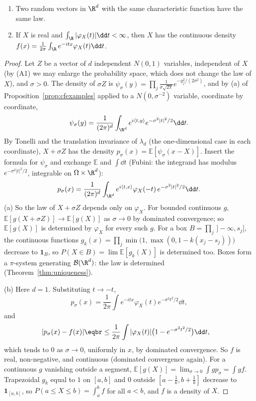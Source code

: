 \begin{theorem}\label{thm:inversion}
\begin{enumerate}[label=(\alph*)]
\item Two random vectors in $\R^d$ with the same characteristic function have the same law.
\item If $X$ is real and $\int_\R|\varphi_X(t)|\dd t<\infty$, then $X$ has the continuous density $f(x)=\frac1{2\pi}\int_\R e^{-itx}\varphi_X(t)\dd t$.
\end{enumerate}
\end{theorem}
\begin{proof}
Let $Z$ be a vector of $d$ independent $N(0,1)$ variables, independent of $X$ (by (A1) we may enlarge the probability space,
which does not change the law of $X$), and $\sigma>0$. The density of $\sigma Z$ is $\psi_\sigma(y)=\prod_j\frac1{\sigma\sqrt{2\pi}}e^{-y_j^2/(2\sigma^2)}$, and by (a) of
Proposition~\ref{prop:cfexamples} applied to a $N(0,\sigma^{-2})$ variable, coordinate by coordinate,
\[
\psi_\sigma(y)=\frac1{(2\pi)^d}\int_{\R^d}e^{i\langle t,y\rangle}e^{-\sigma^2|t|^2/2}\dd t.
\]
By Tonelli and the translation invariance of $\lambda_d$ (the one-dimensional case in each coordinate), $X+\sigma Z$ has the density
$p_\sigma(x)=\mathbb E[\psi_\sigma(x-X)]$. Insert the formula for $\psi_\sigma$ and exchange $\mathbb E$ and $\int\dd t$ (Fubini: the integrand has modulus
$e^{-\sigma^2|t|^2/2}$, integrable on $\Omega\times\R^d$):
\[
p_\sigma(x)=\frac1{(2\pi)^d}\int_{\R^d}e^{i\langle t,x\rangle}\varphi_X(-t)\,e^{-\sigma^2|t|^2/2}\dd t.
\]
(a) So the law of $X+\sigma Z$ depends only on $\varphi_X$. For bounded continuous $g$, $\mathbb E[g(X+\sigma Z)]\to\mathbb E[g(X)]$ as $\sigma\to0$ by dominated
convergence; so $\mathbb E[g(X)]$ is determined by $\varphi_X$ for every such $g$. For a box $B=\prod_j\,]-\infty,s_j]$, the continuous functions
$g_k(x)=\prod_j\min\bigl(1,\max(0,1-k(x_j-s_j))\bigr)$ decrease to $\mathbf 1_B$, so $P(X\in B)=\lim\mathbb E[g_k(X)]$ is determined too. Boxes form a
$\pi$-system generating $\mathcal B(\R^d)$: the law is determined (Theorem~\ref{thm:uniqueness}).

(b) Here $d=1$. Substituting $t\to-t$,
\[
p_\sigma(x)=\frac1{2\pi}\int e^{-itx}\varphi_X(t)e^{-\sigma^2t^2/2}\dd t,
\]
and
\[
\begin{aligned}|p_\sigma(x)-f(x)|&\eqbr\le\frac1{2\pi}\int|\varphi_X(t)|\bigl(1-e^{-\sigma^2t^2/2}\bigr)\dd t,\end{aligned}
\]
which tends to $0$ as $\sigma\to0$, uniformly in $x$, by dominated convergence. So $f$ is real, non-negative, and continuous (dominated convergence again). For a
continuous $g$ vanishing outside a segment, $\mathbb E[g(X)]=\lim_{\sigma\to0}\int gp_\sigma=\int gf$. Trapezoidal $g_k$ equal to $1$ on $[a,b]$ and $0$ outside
$[a-\frac1k,b+\frac1k]$ decrease to $\mathbf 1_{[a,b]}$, so $P(a\le X\le b)=\int_a^bf$ for all $a<b$, and $f$ is a density of $X$.
\end{proof}

